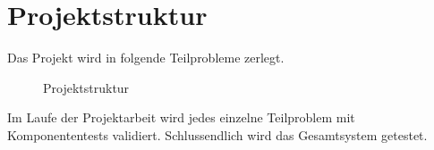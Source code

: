 \section{Projektstruktur}
Das Projekt wird in folgende Teilprobleme zerlegt. 
\begin{figure}[H]
\centering
  \scalebox{0.85}{
 }
	\caption{Projektstruktur}
\end{figure}
Im Laufe der Projektarbeit wird jedes einzelne Teilproblem mit Komponententests validiert. Schlussendlich wird das Gesamtsystem getestet.